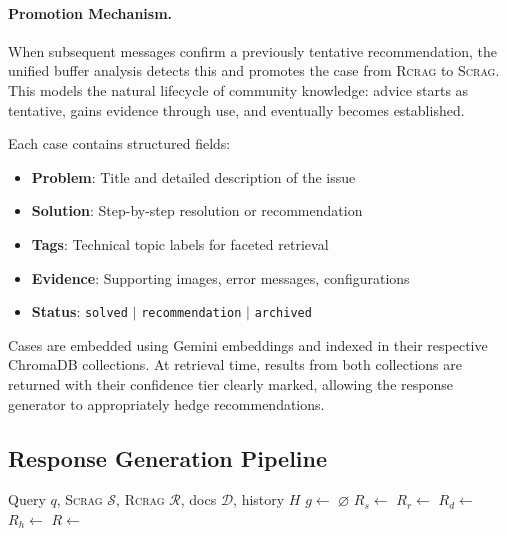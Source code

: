 \documentclass[11pt]{article}
\newcommand{\scrag}{\textsc{Scrag}}
\newcommand{\rcrag}{\textsc{Rcrag}}
\begin{document}
\paragraph{Promotion Mechanism.} When subsequent messages confirm a previously tentative recommendation, the unified buffer analysis detects this and promotes the case from \rcrag{} to \scrag{}. This models the natural lifecycle of community knowledge: advice starts as tentative, gains evidence through use, and eventually becomes established.

Each case contains structured fields:
\begin{itemize}
    \item \textbf{Problem}: Title and detailed description of the issue
    \item \textbf{Solution}: Step-by-step resolution or recommendation
    \item \textbf{Tags}: Technical topic labels for faceted retrieval
    \item \textbf{Evidence}: Supporting images, error messages, configurations
    \item \textbf{Status}: \texttt{solved} $|$ \texttt{recommendation} $|$ \texttt{archived}
\end{itemize}

Cases are embedded using Gemini embeddings and indexed in their respective ChromaDB collections. At retrieval time, results from both collections are returned with their confidence tier clearly marked, allowing the response generator to appropriately hedge recommendations.

\subsection{Response Generation Pipeline}

\begin{algorithm}[t]
\caption{Confidence-Tiered Response Generation}
\label{alg:response}
\begin{algorithmic}[1]
\Require Query $q$, \scrag{} $\mathcal{S}$, \rcrag{} $\mathcal{R}$, docs $\mathcal{D}$, history $H$
\State $g \gets$ 
    \State \Return $\varnothing$
\EndIf
\State $R_s \gets$  
\State $R_r \gets$  
\State $R_d \gets$  
\State $R_h \gets$  
\State $R \gets$ 
    \State \Return {} 
\EndIf
\State \Return {} 
\end{algorithmic}
\end{algorithm}
\end{document}
